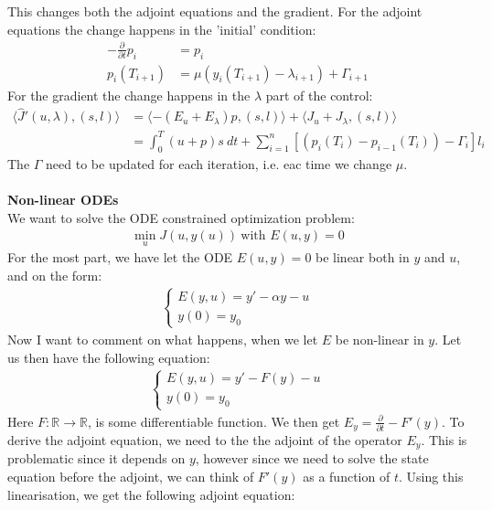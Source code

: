 \documentclass[11pt,a4paper]{report}
\begin{document}
This changes both the adjoint equations and the gradient. For the adjoint equations the change happens in the 'initial' condition:
\begin{align*}
-\frac{\partial }{\partial t}p_i &=p_i  \\
p_i(T_{i+1}) &= \mu(y_{i}(T_{i+1})-\lambda_{i+1} ) + \Gamma_{i+1}
\end{align*}
For the gradient the change happens in the $\lambda$ part of the control:
\begin{align*}
\langle \hat{J}'(u,\lambda), (s,l)\rangle&=\langle -(E_u+E_{\lambda})p, (s,l)\rangle + \langle J_u+J_{\lambda}, (s,l)\rangle \\
&= \int_0^T (u+p)s \ dt +\sum_{i=1}^n[(p_{i}(T_i) -p_{i-1}(T_i) )- \Gamma_i]l_i
\end{align*}
The $\Gamma$ need to be updated for each iteration, i.e. eac time we change $\mu$.
\\
\\
\textbf{Non-linear ODEs}
\\
We want to solve the ODE constrained optimization problem:
\begin{align*}
\min_{u}J(u,y(u)) \ \text{with } E(u,y)=0
\end{align*}
For the most part, we have let the ODE $E(u,y)=0$ be linear both in $y$ and $u$, and on the form:
\begin{align*}
\left\{
     \begin{array}{lr}
       	E(y,u) = y'-\alpha y -u\\
       	   y(0)=y_0
     \end{array}
   \right.
\end{align*} 
Now I want to comment on what happens, when we let $E$ be non-linear in $y$. Let us then have the following equation:
\begin{align*}
\left\{
     \begin{array}{lr}
       	E(y,u) = y'- F(y) -u\\
       	   y(0)=y_0
     \end{array}
   \right.
\end{align*} 
Here $F:\mathbb{R} \rightarrow \mathbb{R}$, is some differentiable function. We then get $E_y = \frac{\partial}{\partial t} - F'(y)$. To derive the adjoint equation, we need to the the adjoint of the operator $E_y$. This is problematic since it depends on $y$, however since we need to solve the state equation before the adjoint, we can think of $F'(y)$ as a function of $t$. Using this linearisation, we get the following adjoint equation: 
\end{document}
